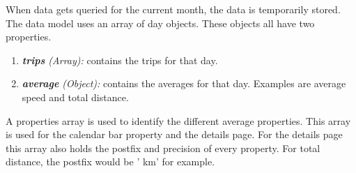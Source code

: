 When data gets queried for the current month, the data is temporarily stored. The data
model uses an array of day objects. These objects all have two properties.
\begin{enumerate}
	\item \textit{\textbf{trips} (Array):} contains the trips for that day.
	\item \textit{\textbf{average} (Object):} contains the averages for that day.
	Examples are average speed and total distance.
\end{enumerate}
A properties array is used to identify the different average properties. This array
is used for the calendar bar property and the details page. For the details page this
array also holds the postfix and precision of every property. For total distance, the
postfix would be ' km' for example.
